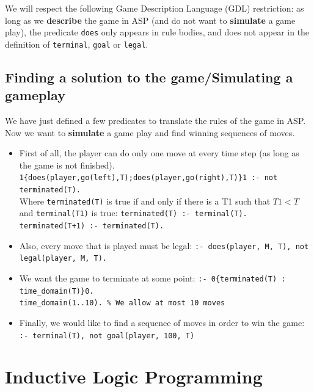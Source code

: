 We will respect the following Game Description Language (GDL) restriction: as long as we \textbf{describe} the game in ASP (and do not want to \textbf{simulate} a game play), the predicate \texttt{does} only appears in rule bodies, and does not appear in the definition of \texttt{terminal}, \texttt{goal} or \texttt{legal}.

\subsection{Finding a solution to the game/Simulating a gameplay}

We have just defined a few predicates to translate the rules of the game in ASP. Now we want to \textbf{simulate} a game play and find winning sequences of moves.
\begin{itemize}
\item First of all, the player can do only one move at every time step (as long as the game is not finished).\newline
\texttt{1\{does(player,go(left),T);does(player,go(right),T)\}1 :- not terminated(T).}\\
Where \texttt{terminated(T)} is true if and only if there is a T1 such that $T1<T$ and \texttt{terminal(T1)} is true:\newline
\texttt{terminated(T) :- terminal(T).}  \\
\texttt{terminated(T+1) :- terminated(T).}

\item Also, every move that is played must be legal:\newline
\texttt{:- does(player, M, T), not legal(player, M, T).}

\item We want the game to terminate at some point:\newline
\texttt{:- 0\{terminated(T) : time\_domain(T)\}0.}\\
\texttt{time\_domain(1..10). \% We allow at most 10 moves} 

\item Finally, we would like to find a sequence of moves in order to win the game:\newline
\texttt{:- terminal(T), not goal(player, 100, T)}

\end{itemize}

\section{Inductive Logic Programming}

